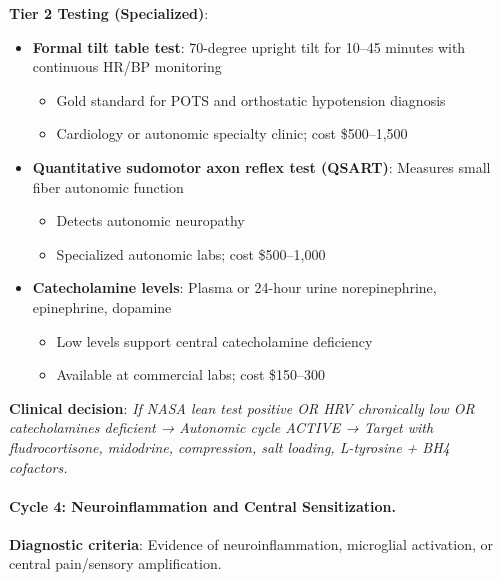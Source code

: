 \textbf{Tier 2 Testing (Specialized)}:
\begin{itemize}
    \item \textbf{Formal tilt table test}: 70-degree upright tilt for 10--45 minutes with continuous HR/BP monitoring
    \begin{itemize}
        \item Gold standard for POTS and orthostatic hypotension diagnosis
        \item Cardiology or autonomic specialty clinic; cost \$500--1,500
    \end{itemize}

    \item \textbf{Quantitative sudomotor axon reflex test (QSART)}: Measures small fiber autonomic function
    \begin{itemize}
        \item Detects autonomic neuropathy
        \item Specialized autonomic labs; cost \$500--1,000
    \end{itemize}

    \item \textbf{Catecholamine levels}: Plasma or 24-hour urine norepinephrine, epinephrine, dopamine
    \begin{itemize}
        \item Low levels support central catecholamine deficiency~\cite{walitt2024deep}
        \item Available at commercial labs; cost \$150--300
    \end{itemize}
\end{itemize}

\textbf{Clinical decision}: \textit{If NASA lean test positive OR HRV chronically low OR catecholamines deficient → Autonomic cycle ACTIVE → Target with fludrocortisone, midodrine, compression, salt loading, L-tyrosine + BH4 cofactors.}

\paragraph{Cycle 4: Neuroinflammation and Central Sensitization.}

\textbf{Diagnostic criteria}: Evidence of neuroinflammation, microglial activation, or central pain/sensory amplification.


